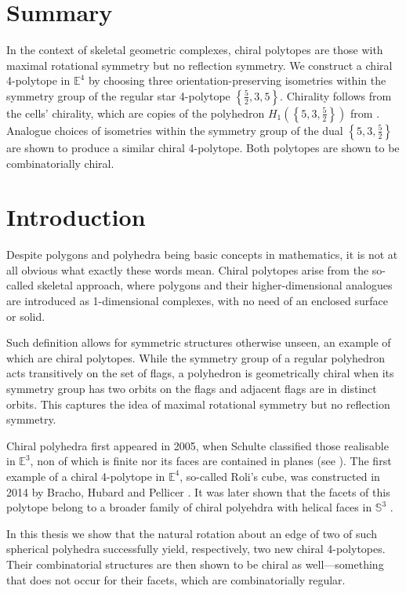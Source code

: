 \documentclass{article}
\theoremstyle{definition}
\newcommand{\E}{\mathbb{E}}
\begin{document}
	
	\section*{Summary}
	In the context of skeletal geometric complexes, chiral polytopes are those with maximal rotational symmetry but no reflection symmetry. We construct a chiral 4-polytope in $\E^4$ by choosing three orientation-preserving isometries within the symmetry group of the regular star 4-polytope $\left\{\frac{5}{2},3,5\right\}$. Chirality follows from the cells' chirality, which are copies of the polyhedron $H_1(\left\{5,3,\frac{5}{2}\right\})$ from \cite{petcox}. Analogue choices of isometries within the symmetry group of the dual $\left\{5,3,\frac{5}{2}\right\}$ are shown to produce a similar chiral 4-polytope. Both polytopes are shown to be combinatorially chiral.
	
	\vspace{1cm}
		\tableofcontents
		\clearpage
	\section{Introduction}
	Despite polygons and polyhedra being basic concepts in mathematics,
	 it is not at all obvious what exactly these words mean. Chiral polytopes arise from the so-called skeletal approach, where polygons and their higher-dimensional analogues are introduced as 1-dimensional complexes, with no need of an enclosed surface or solid.
	
	Such definition allows for symmetric structures otherwise unseen, an example of which are chiral polytopes. While the symmetry group of a regular polyhedron acts transitively on the set of flags, a polyhedron is geometrically chiral when its symmetry group has two orbits on the flags and adjacent flags are in distinct orbits. This captures the idea of maximal rotational symmetry but no reflection symmetry.
	
	Chiral polyhedra first appeared in 2005, when Schulte classified those realisable in $\E^3$, non of which is finite nor its faces are contained in planes (see \cite{chiral-polyhedra-i,chiral-polyhedra-ii}). The first example of a chiral 4-polytope in $\E^4$, so-called Roli's cube, was constructed in 2014 by Bracho, Hubard and Pellicer \cite{rolis-cube}. It was later shown that the facets of this polytope belong to a broader family of chiral polyehdra with helical faces in $\mathbb{S}^3$ \cite{petcox}.
	
	In this thesis we show that the natural rotation about an edge of two of such spherical polyhedra successfully yield, respectively, two new chiral 4-polytopes. Their combinatorial structures are then shown to be chiral as well---something that does not occur for their facets, which are combinatorially regular.
	
\end{document}
